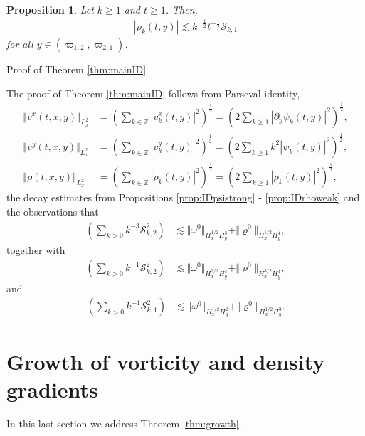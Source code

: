 \documentclass[11pt,reqno]{amsproc}
\makeatletter
\renewcommand\subsection{\@startsection{subsection}{2}%
\normalparindent{.5\linespacing\@plus.7\linespacing}{-.5em}
{\normalfont\bfseries}}
\newtheorem{proposition}{Proposition}[section]
\theoremstyle{definition}
\numberwithin{equation}{section}
\newcommand{\Z}{{\mathbb Z}}
\newcommand{\cS}{{\mathcal S}}
\makeatother
\begin{document}
\begin{proposition}\label{prop:IDrhostrong}
Let $k\geq 1$ and $t\geq 1$. Then,
\begin{align*}
\left| \rho_k(t,y) \right| \lesssim k^{-\frac12}t^{-\frac12}\cS_{k,1}
\end{align*}
for all $y\in (\varpi_{1,2},\varpi_{2,1})$.
\end{proposition}

\subsection{Proof of Theorem \ref{thm:mainID}}

The proof of Theorem \ref{thm:mainID} follows from Parseval identity,
\begin{align*}
\Vert v^x(t,x,y) \Vert_{L^2_x} &= \left( \sum_{k\in \Z} |v^x_k(t,y)|^2 \right)^\frac12 = \left( 2\sum_{k\geq 1} |\partial_y \psi_k(t,y)|^2 \right)^\frac12,  \\
\Vert v^y(t,x,y) \Vert_{L^2_x} &= \left( \sum_{k\in \Z} |v^y_k(t,y)|^2 \right)^\frac12 = \left( 2\sum_{k\geq 1} k^2|\psi_k(t,y)|^2 \right)^\frac12, \\
\Vert \rho(t,x,y) \Vert_{L^2_x} &= \left( \sum_{k\in \Z} |\rho_k(t,y)|^2 \right)^\frac12 = \left( 2\sum_{k\geq 1} |\rho_k(t,y)|^2 \right)^\frac12,
\end{align*}
the decay estimates from Propositions \ref{prop:IDpsistrong} - \ref{prop:IDrhoweak} 
and the observations that
\begin{align*}
\left( \sum_{k>0} k^{-3}\cS_{k,2}^2 \right) & \lesssim \Vert \omega^0 \Vert_{H^{1/2}_x H^3_y} + \Vert \varrho ^0 \Vert_{H^{1/2}_x H^4_y}, 
\end{align*}
together with
\begin{align*}
\left( \sum_{k>0} k^{-1}\cS_{k,2}^2 \right) &\lesssim\Vert \omega^0 \Vert_{H^{3/2}_x H^3_y} + \Vert \varrho^0 \Vert_{H^{3/2}_x H^4_y}, 
\end{align*}
and
\begin{align*}
\left( \sum_{k>0} k^{-1}\cS_{k,1}^2 \right) &\lesssim \Vert \omega^0 \Vert_{H^{1/2}_x H^2_y } + \Vert \varrho^0 \Vert_{H^{1/2}_x H^3_y}.
\end{align*}



\section{Growth of vorticity and density gradients}\label{sec:growth}
In this last section we address Theorem \ref{thm:growth}. 
\end{document}
